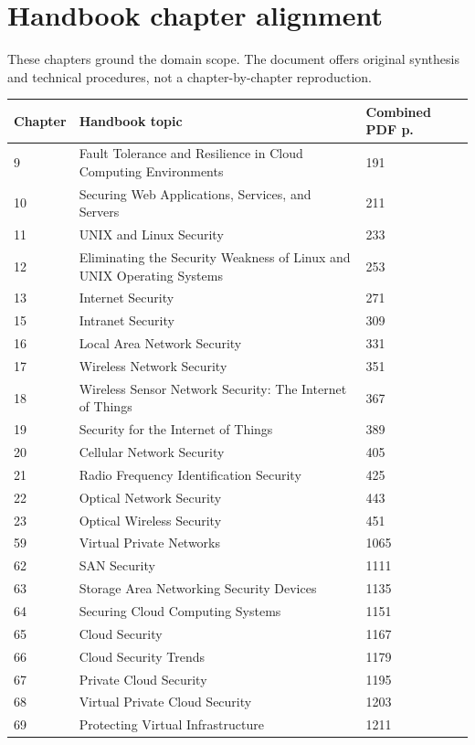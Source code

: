 \documentclass[10pt,letterpaper,oneside]{article}
\begin{document}
\section*{Handbook chapter alignment}
These chapters ground the domain scope. The document offers original synthesis and technical procedures, not a chapter-by-chapter reproduction.
\par\medskip\noindent\begin{longtable}{@{}p{}p{}p{}@{}}\toprule Chapter & Handbook topic & Combined PDF p. \\ \midrule\endhead9 & Fault Tolerance and Resilience in Cloud Computing Environments & 191 \\
10 & Securing Web Applications, Services, and Servers & 211 \\
11 & UNIX and Linux Security & 233 \\
12 & Eliminating the Security Weakness of Linux and UNIX Operating Systems & 253 \\
13 & Internet Security & 271 \\
15 & Intranet Security & 309 \\
16 & Local Area Network Security & 331 \\
17 & Wireless Network Security & 351 \\
18 & Wireless Sensor Network Security: The Internet of Things & 367 \\
19 & Security for the Internet of Things & 389 \\
20 & Cellular Network Security & 405 \\
21 & Radio Frequency Identification Security & 425 \\
22 & Optical Network Security & 443 \\
23 & Optical Wireless Security & 451 \\
59 & Virtual Private Networks & 1065 \\
62 & SAN Security & 1111 \\
63 & Storage Area Networking Security Devices & 1135 \\
64 & Securing Cloud Computing Systems & 1151 \\
65 & Cloud Security & 1167 \\
66 & Cloud Security Trends & 1179 \\
67 & Private Cloud Security & 1195 \\
68 & Virtual Private Cloud Security & 1203 \\
69 & Protecting Virtual Infrastructure & 1211 \\

\end{longtable}
\end{document}
